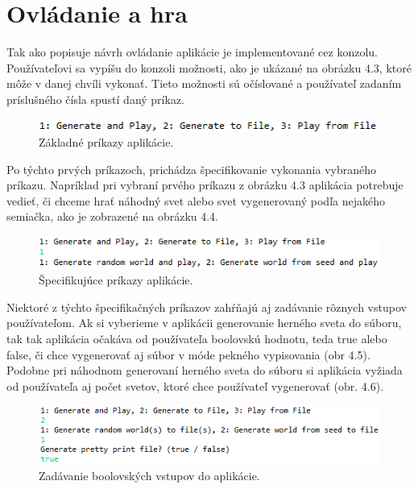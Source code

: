 \section{Ovládanie a hra}
Tak ako popisuje návrh ovládanie aplikácie je implementované cez konzolu. Používateľovi sa vypíšu do konzoli možnosti, ako je ukázané na obrázku 4.3, ktoré môže v danej chvíli vykonať. Tieto možnosti sú očíslované a používateľ zadaním príslušného čísla spustí daný príkaz.
\begin{figure}[H] 
\begin{center}
\includegraphics[scale=1.2]{img/menu.png}
\caption{Základné príkazy aplikácie.}
\label{fig:ch43}
\end{center}
\end{figure}
Po týchto prvých príkazoch, prichádza špecifikovanie vykonania vybraného príkazu. Napríklad pri vybraní prvého príkazu z obrázku 4.3 aplikácia potrebuje vedieť, či chceme hrať náhodný svet alebo svet vygenerovaný podľa nejakého semiačka, ako je zobrazené na obrázku 4.4.
\begin{figure}[H] 
\begin{center}
\includegraphics[scale=1.2]{img/menu2.png}
\caption{Špecifikujúce príkazy aplikácie.}
\label{fig:ch44}
\end{center}
\end{figure}
Niektoré z týchto špecifikačných príkazov zahŕňajú aj zadávanie rôznych vstupov používateľom. Ak si vyberieme v aplikácii generovanie herného sveta do súboru, tak tak aplikácia očakáva od používateľa boolovskú hodnotu, teda true alebo false, či chce vygenerovať aj súbor v móde pekného vypisovania (obr 4.5). Podobne pri náhodnom generovaní herného sveta do súboru si aplikácia vyžiada od používateľa aj počet svetov, ktoré chce používateľ vygenerovať (obr. 4.6).
\begin{figure}[H] 
\begin{center}
\includegraphics[scale=1.2]{img/menu3.png}
\caption{Zadávanie boolovských vstupov do aplikácie.}
\label{fig:ch45}
\end{center}
\end{figure}
